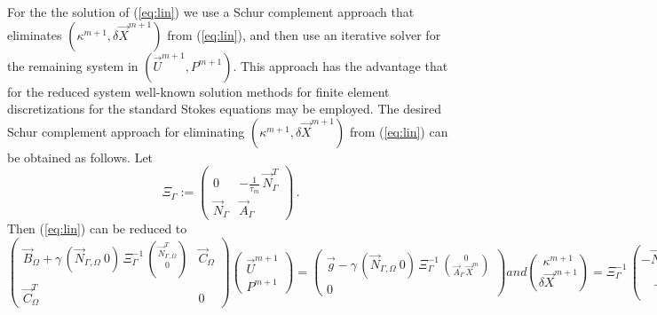 \documentclass[a4paper,12pt,onecolumn]{article}
\newcommand{\NbulkT}{\vec{N}_{\Gamma,\Omega}^T}
\newcommand{\Nbulk}{\vec{N}_{\Gamma,\Omega}}
\begin{document}
For the the solution of (\ref{eq:lin}) we use a Schur complement approach that eliminates $(\kappa^{m+1}, \delta \vec X^{m+1})$ from (\ref{eq:lin}), and then use an iterative solver for the remaining system in $(\vec U^{m+1}, P^{m+1})$. This approach has the advantage that for the reduced system well-known solution methods for finite element discretizations for the standard Stokes equations may be employed. The desired Schur complement approach for eliminating $(\kappa^{m+1},\delta \vec X^{m+1})$ from (\ref{eq:lin}) can be obtained as follows. Let 
\begin{equation} \label{eq:Xi}
\Xi_\Gamma:= \begin{pmatrix}
 0 & - \frac1{\tau_m}\,\vec{N}_\Gamma^T \\
\vec{N}_\Gamma & \vec{A}_\Gamma 
\end{pmatrix} \,.
\end{equation}
Then (\ref{eq:lin}) can be reduced to
\begin{subequations}
\begin{equation} \label{eq:SchurkX}
\begin{pmatrix}
\vec B_\Omega + \gamma\,(\Nbulk \ 0)\,\Xi_\Gamma^{-1}\,
\binom{\NbulkT}{0} & \vec C_\Omega \\
\vec C_\Omega^T & 0 
\end{pmatrix}
\begin{pmatrix}
\vec U^{m+1} \\ P^{m+1} 
\end{pmatrix}
= \begin{pmatrix}
\vec g
-\gamma\,(\Nbulk \ 0)\, \Xi_\Gamma^{-1}\,
\binom{0}{\vec{A}_\Gamma\,\vec{X}^{m}} \\
0
\end{pmatrix}
\end{equation}
and
\begin{equation}
\binom{\kappa^{m+1}}{\delta\vec{X}^{m+1}} = \Xi_\Gamma^{-1}\,
\binom{-\NbulkT\,\vec U^{m+1}}{-\vec{A}_\Gamma\,\vec{X}^{m}}\,.
\label{eq:SchurkXb}
\end{equation}
\end{subequations}
\end{document}
